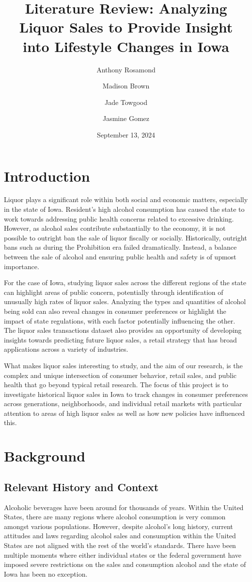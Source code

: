 \documentclass{article}
\title{\textbf{Literature Review:} Analyzing Liquor Sales to Provide Insight into Lifestyle Changes in Iowa}
\author[1]{Anthony Rosamond}
\author[1]{Madison Brown}
\author[1]{Jade Towgood}
\author[1]{Jasmine Gomez}
\affil[1]{Arizona State University, Tempe, AZ 85281, USA}
\date{September 13, 2024}
\begin{document}
\maketitle

\section{Introduction}

Liquor plays a significant role within both social and economic matters, especially in the state of Iowa. Resident’s high alcohol consumption has caused the state to work towards addressing public health concerns related to excessive drinking. However, as alcohol sales contribute substantially to the economy, it is not possible to outright ban the sale of liquor fiscally or socially. Historically, outright bans such as during the Prohibition era failed dramatically. Instead, a balance between the sale of alcohol and ensuring public health and safety is of upmost importance. 

For the case of Iowa, studying liquor sales across the different regions of the state can highlight areas of public concern, potentially through identification of unusually high rates of liquor sales. Analyzing the types and quantities of alcohol being sold can also reveal changes in consumer preferences or highlight the impact of state regulations, with each factor potentially influencing the other. The liquor sales transactions dataset \cite{liquor-sales} also provides an opportunity of developing insights towards predicting future liquor sales, a retail strategy that has broad applications across a variety of industries. 

What makes liquor sales interesting to study, and the aim of our research, is the complex and unique intersection of consumer behavior, retail sales, and public health that go beyond typical retail research. The focus of this project is to investigate historical liquor sales in Iowa to track changes in consumer preferences across generations, neighborhoods, and individual retail markets with particular attention to areas of high liquor sales as well as how new policies have influenced this. 

\section{Background}
\subsection{Relevant History and Context}
Alcoholic beverages have been around for thousands of years. Within the United States, there are many regions where alcohol consumption is very common amongst various populations. However, despite alcohol's long history, current attitudes and laws regarding alcohol sales and consumption within the United States are not aligned with the rest of the world's standards. There have been multiple moments where either individual states or the federal government have imposed severe restrictions on the sales and consumption alcohol and the state of Iowa has been no exception. 
\end{document}
